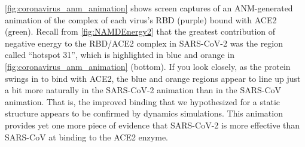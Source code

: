 \autoref{fig:coronavirus_anm_animation} shows screen captures of an ANM-generated animation of the complex of each virus's RBD (purple) bound with ACE2 (green). Recall from \autoref{fig:NAMDEnergy2} that the greatest contribution of negative energy to the RBD/ACE2 complex in SARS-CoV-2 was the region called ``hotspot 31'', which is highlighted in blue and orange in \autoref{fig:coronavirus_anm_animation} (bottom). If you look closely, as the protein swings in to bind with ACE2, the blue and orange regions appear to line up just a bit more naturally in the SARS-CoV-2 animation than in the SARS-CoV animation. That is, the improved binding that we hypothesized for a static structure appears to be confirmed by dynamics simulations. This animation provides yet one more piece of evidence that SARS-CoV-2 is more effective than SARS-CoV at binding to the ACE2 enzyme.\\


